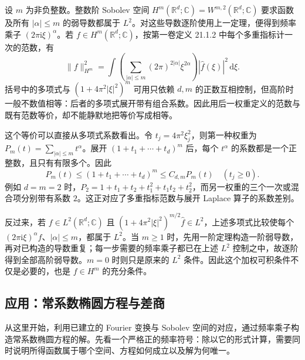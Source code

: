 设 \(m\) 为非负整数。整数阶 Sobolev 空间 \(H^m(\mathbb R^d;\mathbb C)=W^{m,2}(\mathbb R^d;\mathbb C)\) 要求函数及所有 \(|\alpha|\leq m\) 的弱导数都属于 \(L^2\)。对这些导数逐阶使用上一定理，便得到频率乘子 \((2\pi\mathrm i\xi)^\alpha\)。若 \(f\in H^m(\mathbb R^d;\mathbb C)\)，按第一卷定义 21.1.2 中每个多重指标计一次的范数，有
\[
 \|f\|_{H^m}^2
 =\int\left(\sum_{|\alpha|\leq m}(2\pi)^{2|\alpha|}\xi^{2\alpha}\right)|\widehat f(\xi)|^2\,\mathrm{d}\xi.
\]
括号中的多项式与 \((1+4\pi^2|\xi|^2)^m\) 可用只依赖 \(d,m\) 的正数互相控制，但高阶时一般不数值相等：后者的多项式展开带有组合系数。因此用后一权重定义的范数与既有范数等价，却不能静默地把等价写成相等。

\ProseParagraphBreak

这个等价可以直接从多项式系数看出。令 \(t_j=4\pi^2\xi_j^2\)，则第一种权重为 \(P_m(t)=\sum_{|\alpha|\leq m}t^\alpha\)。展开 \((1+t_1+\cdots+t_d)^m\) 后，每个 \(t^\alpha\) 的系数都是一个正整数，且只有有限多个。因此
\[
 P_m(t)\leq(1+t_1+\cdots+t_d)^m\leq C_{d,m}P_m(t)
 \quad(t_j\geq0).
\]
例如 \(d=m=2\) 时，\(P_2=1+t_1+t_2+t_1^2+t_1t_2+t_2^2\)，而另一权重的三个一次或混合项分别带有系数 \(2\)。这正对应了多重指标范数与展开 Laplace 算子的系数差别。

反过来，若 \(f\in L^2(\mathbb R^d;\mathbb C)\) 且 \((1+4\pi^2|\xi|^2)^{m/2}\widehat f\in L^2\)，上述多项式比较使每个 \((2\pi\mathrm i\xi)^\alpha\widehat f\)、\(|\alpha|\leq m\)，都属于 \(L^2\)。当 \(m\geq1\) 时，先用一阶定理构造一阶弱导数，再对已构造的导数重复；每一步需要的频率乘子都已在上述 \(L^2\) 控制之中，故逐阶得到全部高阶弱导数。\(m=0\) 时则只是原来的 \(L^2\) 条件。因此这个加权可积条件不仅是必要的，也是 \(f\in H^m\) 的充分条件。

\subsection{应用：常系数椭圆方程与差商}
\label{b2:subsec:040106}

从这里开始，利用已建立的 Fourier 变换与 Sobolev 空间的对应，通过频率乘子构造常系数椭圆方程的解。先看一个严格正的频率符号：除以它的形式计算，需要同时说明所得函数属于哪个空间、方程如何成立以及解为何唯一。

